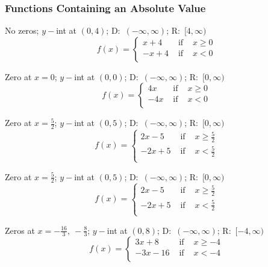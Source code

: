 \documentclass[12pt]{book}
\theoremstyle{definition}
\begin{document}
\subsubsection{Functions Containing an Absolute Value}


\begin{oddenumerate}
\item No zeros;  $y-$int at $(0,4)$; D:~$(-\infty,\infty)$; R:~$[4,\infty)$
$$f(x) = \left\{  \begin{array}{rcr} 
x+4 & \mbox{ if } & x \geq 0 \\
-x+4 & \mbox{ if } & x < 0 \\ \end{array}\right.$$
\item Zero at $x=0$; $y-$int at $(0,0)$; D:~$(-\infty,\infty)$; R:~$[0,\infty)$
$$f(x) = \left\{  \begin{array}{rcr} 
 4x & \mbox{ if } & x \geq 0 \\
 -4x & \mbox{ if } & x < 0 \\ \end{array}\right.$$
\item Zero at $x=\frac{5}{2}$;  $y-$int at $(0,5)$;  D:~$(-\infty,\infty)$; R:~$[0,\infty)$
$$f(x) = \left\{  \begin{array}{rcr} 
 2x-5 & \mbox{ if } & x \geq \frac{5}{2} \\
 -2x+5 & \mbox{ if } & x < \frac{5}{2} \\ \end{array}\right.$$
\item Zero at $x=\frac{5}{2}$;  $y-$int at $(0,5)$;  D:~$(-\infty,\infty)$; R:~$[0,\infty)$
$$f(x) = \left\{  \begin{array}{rcr} 
 2x-5 & \mbox{ if } & x \geq \frac{5}{2} \\
 -2x+5 & \mbox{ if } & x < \frac{5}{2} \\ \end{array}\right.$$
\item Zeros at $x=-\frac{16}{3},~-\frac{8}{3}$; $y-$int at $(0,8)$; D:~$(-\infty,\infty)$; R:~$[-4,\infty)$
$$f(x) = \left\{  \begin{array}{rcr} 
3x+8 & \mbox{ if } & x \geq -4 \\
-3x-16 & \mbox{ if } & x < -4 \\ \end{array}\right.$$
\end{oddenumerate}
\end{document}
